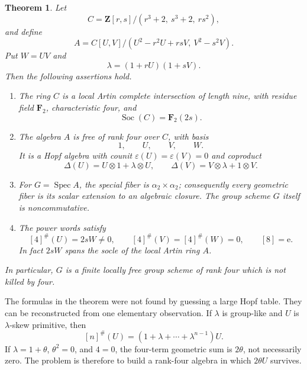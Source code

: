 \documentclass[11pt]{amsart}
\newtheorem{theorem}{Theorem}[section]
\theoremstyle{definition}
\theoremstyle{remark}
\newcommand{\Z}{\mathbf Z}
\newcommand{\F}{\mathbf F}
\newcommand{\Spec}{\operatorname{Spec}}
\newcommand{\Soc}{\operatorname{Soc}}
\newcommand{\eps}{\varepsilon}
\newcommand{\ot}{\otimes}
\newcommand{\unit}{\mathrm e}
\begin{document}
\begin{theorem}\label{thm:main}
Let
\begin{equation}\label{eq:C-intro}
 C=\Z[r,s]/(r^3+2,\ s^3+2,\ rs^2),
\end{equation}
and define
\begin{equation}\label{eq:A-intro}
 A=C[U,V]/(U^2-r^2U+rsV,\ V^2-s^2V).
\end{equation}
Put \(W=UV\) and
\begin{equation}\label{eq:lambda-intro}
 \lambda=(1+rU)(1+sV).
\end{equation}
Then the following assertions hold.
\begin{enumerate}
\item The ring \(C\) is a local Artin complete intersection of length nine,
with residue field \(\F_2\), characteristic four, and
\[
 \Soc(C)=\F_2(2s).
\]
\item The algebra \(A\) is free of rank four over \(C\), with basis
\[
 1,\qquad U,\qquad V,\qquad W.
\]
It is a Hopf algebra with counit \(\eps(U)=\eps(V)=0\) and coproduct
\begin{equation}\label{eq:Delta-intro}
 \Delta(U)=U\ot1+\lambda\ot U,
 \qquad
 \Delta(V)=V\ot\lambda+1\ot V.
\end{equation}
\item For \(G=\Spec A\), the special fiber is
\(\alpha _2\times\alpha _2\); consequently every geometric fiber is its
scalar extension to an algebraic closure.  The group scheme \(G\) itself
is noncommutative.
\item The power words satisfy
\begin{equation}\label{eq:powers-intro}
 [4]^\#(U)=2sW\ne0,
 \qquad
 [4]^\#(V)=[4]^\#(W)=0,
 \qquad
 [8]=\unit.
\end{equation}
In fact \(2sW\) spans the socle of the local Artin ring \(A\).
\end{enumerate}
In particular, \(G\) is a finite locally free group scheme of rank four
which is not killed by four.
\end{theorem}

The formulas in the theorem were not found by guessing a large Hopf table.
They can be reconstructed from one elementary observation.  If \(\lambda\)
is group-like and \(U\) is \(\lambda\)-skew primitive, then
\[
 [n]^\#(U)=(1+\lambda+\cdots+\lambda^{n-1})U.
\]
If \(\lambda=1+\theta\), \(\theta^2=0\), and \(4=0\), the four-term
geometric sum is \(2\theta\), not necessarily zero.  The problem is
therefore to build a rank-four algebra in which \(2\theta U\) survives.
\end{document}
